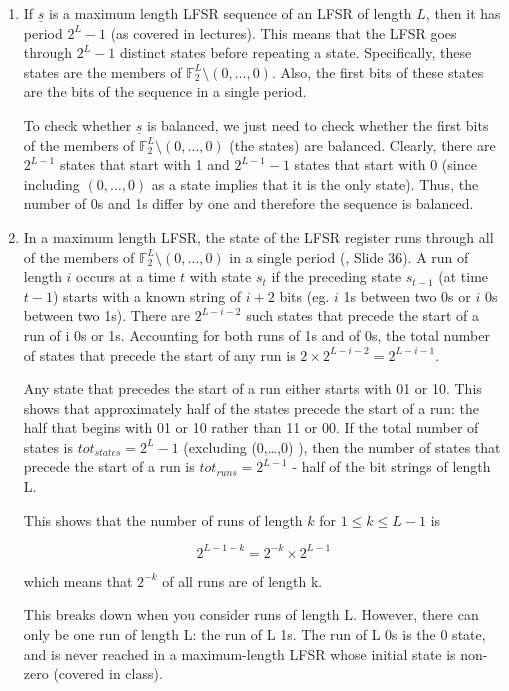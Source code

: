 \begin{enumerate}

\item If $\underline{s}$ is a maximum length LFSR sequence of an LFSR of length
$L$, then it has period $2^L-1$ (as covered in lectures). This means that the
LFSR goes through $2^L-1$ distinct states before repeating a state.
Specifically, these states are the members of $\mathbb{F}_2^L \setminus
(0,\dots,0)$. Also, the first bits of these states are the bits of the sequence
in a single period.

To check whether $\underline{s}$ is balanced, we just need to check whether the
first bits of the members of $\mathbb{F}_2^L \setminus (0,\dots,0)$ (the states)
are balanced. Clearly, there are $2^{L-1}$ states that start with 1 and
$2^{L-1}-1$ states that start with 0 (since including $(0,\dots,0)$ as a state
implies that it is the only state). Thus, the number of 0s and 1s differ by one
and therefore the sequence is balanced.

\item In a maximum length LFSR, the state of the LFSR register runs through all
of the members of $\mathbb{F}_2^L \setminus (0,\dots,0)$ in a single period
(\cite{slides}, Slide 36). A run of length $i$ occurs at a time $t$ with state
$s_t$ if the preceding state $s_{t-1}$ (at time $t-1$) starts with a known
string of $i+2$ bits (eg. $i$ 1s between two 0s or $i$ 0s between two 1s). There
are $2^{L-i-2}$ such states that precede the start of a run of i 0s or 1s.
Accounting for both runs of 1s and of 0s, the total number of states that
precede the start of any run is $2 \times 2^{L-i-2} = 2^{L-i-1}$.

Any state that precedes the start of a run either starts with 01 or 10. This
shows that approximately half of the states precede the start of a run: the half
that begins with 01 or 10 rather than 11 or 00. If the total number of states is
$tot_{states} = 2^L-1$ (excluding (0,\dots,0) ), then the number of states that
precede the start of a run is $tot_{runs} = 2^{L-1}$ - half of the bit strings
of length L.

This shows that the number of runs of length $k$ for $1 \le k \le L-1$ is

\[2^{L-1-k} = 2^{-k} \times 2^{L-1}\]

which means that $2^{-k}$ of all runs are of length k.

This breaks down when you consider runs of length L. However, there can only be
one run of length L: the run of L 1s. The run of L 0s is the 0 state, and is
never reached in a maximum-length LFSR whose initial state is non-zero (covered
in class).

\end{enumerate}
